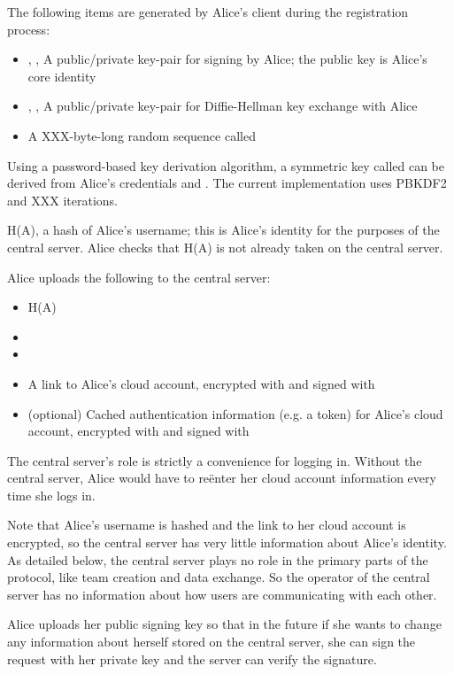 \documentclass[pldi,10pt,preprint]{sigplanconf-pldi16}
\begin{document}
The following items are generated by Alice's client during the registration process:

\begin{itemize}
\item {}, , A public/private key-pair for signing by Alice; the public key is Alice's core identity
\item {}, , A public/private key-pair for Diffie-Hellman key exchange with Alice
\item A XXX-byte-long random sequence called 
\end{itemize}

Using a password-based key derivation algorithm, a symmetric key called  can be derived from Alice's credentials and .
The current implementation uses PBKDF2 and XXX iterations.

H(A), a hash of Alice's username; this is Alice's identity for the purposes of the central server.
Alice checks that H(A) is not already taken on the central server.

Alice uploads the following to the central server:

\begin{itemize}
\item H(A)
\item {}
\item {}
\item A link to Alice's cloud account, encrypted with  and signed with 
\item (optional) Cached authentication information (e.g. a token) for Alice's cloud account, encrypted with  and signed with 
\end{itemize}

The central server's role is strictly a convenience for logging in.
Without the central server, Alice would have to re\"{e}nter her cloud account information every time she logs in.

Note that Alice's username is hashed and the link to her cloud account is encrypted, so the central server has very little information about Alice's identity.
As detailed below, the central server plays no role in the primary parts of the protocol, like team creation and data exchange.
So the operator of the central server has no information about how users are communicating with each other.

Alice uploads her public signing key so that in the future if she wants to change any information about herself stored on the central server, she can sign the request with her private key and the server can verify the signature.
\end{document}
